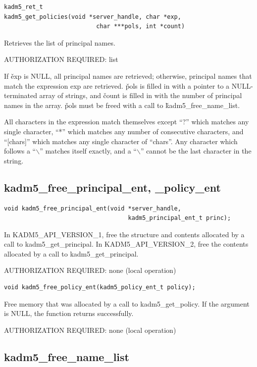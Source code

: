 \begin{verbatim}
kadm5_ret_t
kadm5_get_policies(void *server_handle, char *exp,
                          char ***pols, int *count)
\end{verbatim}

Retrieves the list of principal names.

AUTHORIZATION REQUIRED: list

If \v{exp} is NULL, all principal names are retrieved; otherwise,
principal names that match the expression exp are retrieved.  \v{pols}
is filled in with a pointer to a NULL-terminated array of strings, and
\v{count} is filled in with the number of principal names in the
array.  \v{pols} must be freed with a call to
\v{kadm5_free_name_list}.

All characters in the expression match themselves except ``?'' which
matches any single character, ``*'' which matches any number of
consecutive characters, and ``[chars]'' which matches any single
character of ``chars''. Any character which follows a ``$\backslash$''
matches itself exactly, and a ``$\backslash$'' cannot be the last
character in the string.

\subsection{kadm5_free_principal_ent, _policy_ent}

\begin{verbatim}
void kadm5_free_principal_ent(void *server_handle,
                                   kadm5_principal_ent_t princ);
\end{verbatim}

In KADM5_API_VERSION_1, free the structure and contents allocated by a
call to kadm5_get_principal.  In KADM5_API_VERSION_2, free the
contents allocated by a call to kadm5_get_principal.

AUTHORIZATION REQUIRED: none (local operation)

\begin{verbatim}
void kadm5_free_policy_ent(kadm5_policy_ent_t policy);
\end{verbatim}

Free memory that was allocated by a call to kadm5_get_policy.  If
the argument is NULL, the function returns successfully.

AUTHORIZATION REQUIRED: none (local operation)

\subsection{kadm5_free_name_list}

